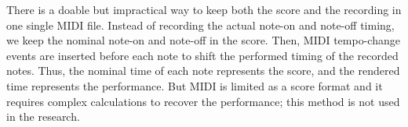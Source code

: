 There is a doable but impractical way to keep both the score and the recording in one single MIDI file. Instead of recording the actual note-on and note-off timing, we keep the nominal note-on and note-off in the score. Then, MIDI tempo-change events are inserted before each note to shift the performed timing of the recorded notes. Thus, the nominal time of each note represents the score, and the rendered time represents the performance. But MIDI is limited as a score format and it requires complex calculations to recover the performance; this method is not used in the research.


